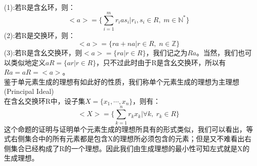 \\
\indent (1):若R是含幺环，则：
\[
<a>=\{\sum_{i=1}^mr_ias_i|r_i,s_i\in R,\; m\in \mathbb{N}^*\}
\]
\indent (2):若R是交换环，则：
\[
<a>=\{ra+na|r\in R,\; n\in \mathbb{Z}\}
\]
\indent (3):若R是含幺交换环，则$<a>=\{ra|r\in R\}$，我们记之为$Ra$。当然，我们也可以类似地定义$aR=\{ar|r\in R\}$，只不过此时由于R是含幺交换环，所以有$Ra=aR=<a>$。\\
鉴于单元素生成的理想有如此好的性质，我们称单个元素生成的理想为主理想(Principal Ideal)\\
在含幺交换环R中，设子集$X=\{x_1,\cdots,x_n\}$，则有：
\[
<X>=\{\sum_{k=1}^nr_kx_k|\forall k,\; r_k\in R\}
\]
这个命题的证明与证明单个元素生成的理想所具有的形式类似，我们可以看出，等式右侧集合中的所有元素都是包含X的理想所必须包含的元素；但是又不难看出右侧集合已经构成了R的一个理想。因此我们由生成理想的最小性可知左式就是X的生成理想。\\
 
